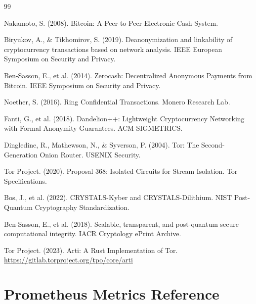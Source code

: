 \documentclass[11pt,a4paper]{article}
\begin{document}
\newpage
\begin{thebibliography}{99}

Nakamoto, S. (2008). Bitcoin: A Peer-to-Peer Electronic Cash System.

Biryukov, A., \& Tikhomirov, S. (2019). Deanonymization and linkability of cryptocurrency transactions based on network analysis. IEEE European Symposium on Security and Privacy.

Ben-Sasson, E., et al. (2014). Zerocash: Decentralized Anonymous Payments from Bitcoin. IEEE Symposium on Security and Privacy.

Noether, S. (2016). Ring Confidential Transactions. Monero Research Lab.

Fanti, G., et al. (2018). Dandelion++: Lightweight Cryptocurrency Networking with Formal Anonymity Guarantees. ACM SIGMETRICS.

Dingledine, R., Mathewson, N., \& Syverson, P. (2004). Tor: The Second-Generation Onion Router. USENIX Security.

Tor Project. (2020). Proposal 368: Isolated Circuits for Stream Isolation. Tor Specifications.

Bos, J., et al. (2022). CRYSTALS-Kyber and CRYSTALS-Dilithium. NIST Post-Quantum Cryptography Standardization.

Ben-Sasson, E., et al. (2018). Scalable, transparent, and post-quantum secure computational integrity. IACR Cryptology ePrint Archive.

Tor Project. (2023). Arti: A Rust Implementation of Tor. \url{https://gitlab.torproject.org/tpo/core/arti}

\end{thebibliography}


\newpage
\appendix
\section{Prometheus Metrics Reference}
\end{document}
